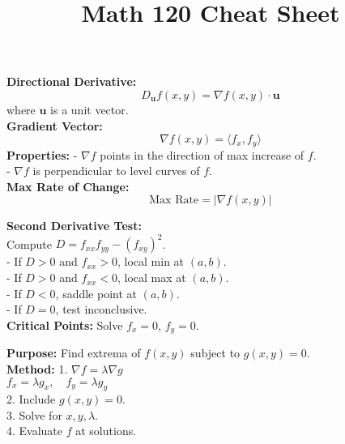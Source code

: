 \documentclass[9pt]{article}
\title{\footnotesize \textbf{Math 120 Cheat Sheet}} %
\date{} %
\begin{document}
\maketitle
\vspace{-15pt} %
\begin{multicols}{2}
\footnotesize %

\begin{tcolorbox}[title=\textbf{Directional Derivatives and Gradient Vector}, colframe=lightblue]
\textbf{Directional Derivative:} 	
\[ D_{\mathbf{u}} f(x, y) = \nabla f(x, y) \cdot \mathbf{u} \]
where \( \mathbf{u} \) is a unit vector. \\
\textbf{Gradient Vector:}
\[ \nabla f(x, y) = \langle f_x, f_y \rangle \]
\textbf{Properties:}
- \( \nabla f \) points in the direction of max increase of \( f \). \\
- \( \nabla f \) is perpendicular to level curves of \( f \). \\
\textbf{Max Rate of Change:}
\[ \text{Max Rate} = |\nabla f(x, y)| \]
\end{tcolorbox}

\begin{tcolorbox}[title=\textbf{Maximum and Minimum Values}, colframe=lightgreen]
\textbf{Second Derivative Test:} \\
Compute \( D = f_{xx} f_{yy} - (f_{xy})^2 \). \\
- If \( D > 0 \) and \( f_{xx} > 0 \), local min at \( (a, b) \). \\
- If \( D > 0 \) and \( f_{xx} < 0 \), local max at \( (a, b) \). \\
- If \( D < 0 \), saddle point at \( (a, b) \). \\
- If \( D = 0 \), test inconclusive. \\
\textbf{Critical Points:} Solve \( f_x = 0 \), \( f_y = 0 \).
\end{tcolorbox}

\begin{tcolorbox}[title=\textbf{Lagrange Multipliers}, colframe=lightpink]
\textbf{Purpose:} Find extrema of \( f(x, y) \) subject to \( g(x, y) = 0 \). \\
\textbf{Method:}
1. \( \nabla f = \lambda \nabla g \) \\
   \( f_x = \lambda g_x, \quad f_y = \lambda g_y \) \\
2. Include \( g(x, y) = 0 \). \\
3. Solve for \( x, y, \lambda \). \\
4. Evaluate \( f \) at solutions.
\end{tcolorbox}


\end{multicols}
\end{document}
